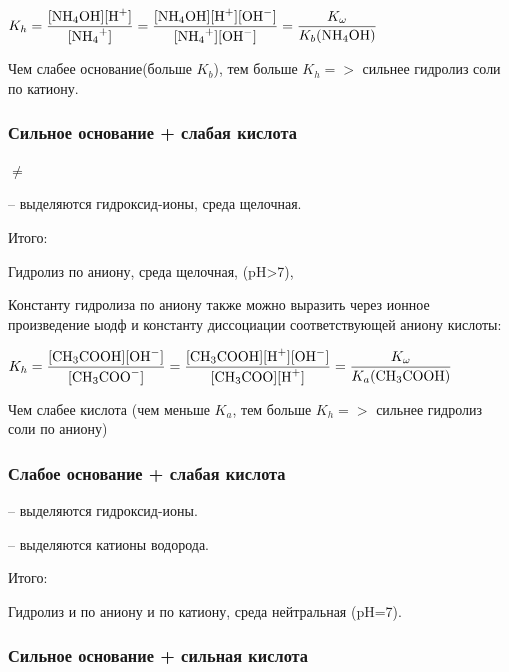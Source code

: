 $\displaystyle K_h = \frac{[\ce{NH4OH}][\ce{H+}]}{[\ce{NH4+}]} = \frac{[\ce{NH4OH}][\ce{H+}][\ce{OH-}]}{[\ce{NH4+}][\ce{OH-}]}=\frac{K_\omega}{K_b(\ce{NH4OH})}$

Чем слабее основание(больше $K_b$), тем больше $K_h =>$ сильнее гидролиз соли по катиону.

\subsubsection{Сильное основание + слабая кислота}


 $\neq$

 -- выделяются гидроксид-ионы, среда щелочная.

Итого:


Гидролиз по аниону, среда щелочная, (pH>7),

Константу гидролиза по аниону также можно выразить через ионное произведение ыодф и константу диссоциации соответствующей аниону кислоты:

$\displaystyle K_h = \frac{[\ce{CH3COOH}][\ce{OH-}]}{[\ce{CH3COO-}]} = \frac{[\ce{CH3COOH}][\ce{H+}][\ce{OH-}]}{[\ce{CH3COO}][\ce{H+}]}=\frac{K_\omega}{K_a(\ce{CH3COOH})}$

Чем слабее кислота (чем меньше $K_a$, тем больше $K_h =>$ сильнее гидролиз соли по аниону)
\subsubsection{Слабое основание + слабая кислота}


 -- выделяются гидроксид-ионы.


 -- выделяются катионы водорода.

Итого:


Гидролиз и по аниону и по катиону, среда нейтральная (pH=7).

\subsubsection{Сильное основание + сильная кислота}

